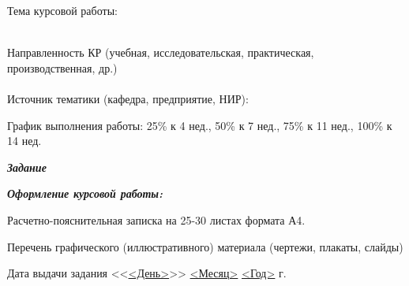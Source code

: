 \documentclass[utf8x, 11pt, oneside, a4paper]{article}
\begin{document}
	\begin{flushleft}
		Тема курсовой работы: \uline{ \hfill}
		\\ \uline{ \hfill}
		\\ \uline{ \hfill}
	\end{flushleft}

	\begin{flushleft}
		Направленность КР (учебная, исследовательская, практическая, производственная, др.)
		\\ \uline{\hfill}
		\\ Источник тематики (кафедра, предприятие, НИР): \uline{\hfill}
	\end{flushleft}

	\begin{flushleft}
		График выполнения работы:  25\% к 4 нед., 50\% к 7 нед., 75\% к 11 нед., 100\% к 14 нед.
	\end{flushleft}

	\begin{flushleft}
		\textbf{\textit{Задание}} \uline{\hfill} %
		
		\uline{\hfill}
		
		\uline{\hfill}

		\uline{\hfill}

		\uline{\hfill}
	\end{flushleft}

	\begin{flushleft}
		\textbf{\textit{Оформление курсовой работы:}}
		
		Расчетно-пояснительная записка на 25-30 листах формата А4.

		Перечень графического (иллюстративного) материала (чертежи, плакаты, слайды)
		
		\uline{\hfill}

		\uline{\hfill}

		\uline{\hfill}

		\uline{\hfill}
	\end{flushleft}

	\begin{flushleft}
		Дата выдачи задания <<\uline{<День>}>> \uline{<Месяц>} \uline{<Год>} г. %
	\end{flushleft}
\end{document}
